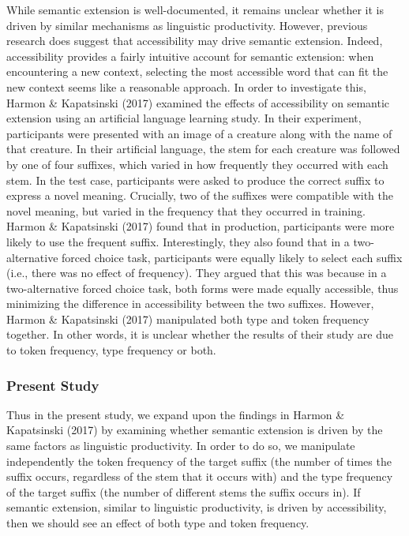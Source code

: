 \documentclass[
  letterpaper,
  DIV=11,
  numbers=noendperiod]{scrartcl}
\begin{document}
While semantic extension is well-documented, it remains unclear whether
it is driven by similar mechanisms as linguistic productivity. However,
previous research does suggest that accessibility may drive semantic
extension. Indeed, accessibility provides a fairly intuitive account for
semantic extension: when encountering a new context, selecting the most
accessible word that can fit the new context seems like a reasonable
approach. In order to investigate this, Harmon \& Kapatsinski (2017)
examined the effects of accessibility on semantic extension using an
artificial language learning study. In their experiment, participants
were presented with an image of a creature along with the name of that
creature. In their artificial language, the stem for each creature was
followed by one of four suffixes, which varied in how frequently they
occurred with each stem. In the test case, participants were asked to
produce the correct suffix to express a novel meaning. Crucially, two of
the suffixes were compatible with the novel meaning, but varied in the
frequency that they occurred in training. Harmon \& Kapatsinski (2017)
found that in production, participants were more likely to use the
frequent suffix. Interestingly, they also found that in a
two-alternative forced choice task, participants were equally likely to
select each suffix (i.e., there was no effect of frequency). They argued
that this was because in a two-alternative forced choice task, both
forms were made equally accessible, thus minimizing the difference in
accessibility between the two suffixes. However, Harmon \& Kapatsinski
(2017) manipulated both type and token frequency together. In other
words, it is unclear whether the results of their study are due to token
frequency, type frequency or both.

\subsubsection{Present Study}\label{present-study}

Thus in the present study, we expand upon the findings in Harmon \&
Kapatsinski (2017) by examining whether semantic extension is driven by
the same factors as linguistic productivity. In order to do so, we
manipulate independently the token frequency of the target suffix (the
number of times the suffix occurs, regardless of the stem that it occurs
with) and the type frequency of the target suffix (the number of
different stems the suffix occurs in). If semantic extension, similar to
linguistic productivity, is driven by accessibility, then we should see
an effect of both type and token frequency.
\end{document}
